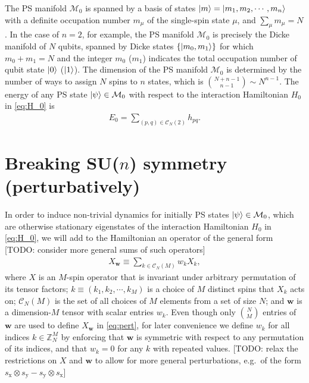 \documentclass[nofootinbib,notitlepage,11pt]{revtex4-2}
\newcommand{\p}[1]{\left(#1\right)} %
\renewcommand{\set}[1]{\left\{#1\right\}} %
\newcommand{\m}{\bm} %
\newcommand{\1}{\mathds{1}}
\newcommand{\x}{\text{x}}
\newcommand{\y}{\text{y}}
\newcommand{\C}{\mathcal{C}}
\newcommand{\M}{\mathcal{M}}
\newcommand{\ZZ}{\mathbb{Z}}
\newcommand{\red}[1]{{\color{red} #1}}
\begin{document}
The PS manifold $\M_0$ is spanned by a basis of states
$\ket{m}=\ket{m_1,m_2,\cdots,m_n}$ with a definite occupation number
$m_\mu$ of the single-spin state $\mu$, and $\sum_\mu m_\mu=N$.  In
the case of $n=2$, for example, the PS manifold $\M_0$ is precisely
the Dicke manifold\cite{dicke1954coherence} of $N$ qubits, spanned by
Dicke states $\set{\ket{m_0,m_1}}$ for which $m_0+m_1=N$ and the
integer $m_0$ ($m_1$) indicates the total occupation number of qubit
state $\ket{0}$ ($\ket{1}$).  The dimension of the PS manifold $\M_0$
is determined by the number of ways to assign $N$ spins to $n$ states,
which is ${N+n-1 \choose n-1}\sim N^{n-1}$.  The energy of any PS
state $\ket\psi\in\M_0$ with respect to the interaction Hamiltonian
$H_0$ in \eqref{eq:H_0} is
\begin{align}
  E_0 = \sum_{\p{p,q}\in\C_N\p{2}} h_{pq}.
\end{align}

\section{Breaking SU($n$) symmetry (perturbatively)}
\label{eq:pert_theory}

In order to induce non-trivial dynamics for initially PS states
$\ket\psi\in\M_0$, which are otherwise stationary eigenstates of the
interaction Hamiltonian $H_0$ in \eqref{eq:H_0}, we will add to the
Hamiltonian an operator of the general form \red{[TODO: consider more
  general sums of such operators]}
\begin{align}
  X_{\m w} \equiv \sum_{k\in\C_N\p{M}} w_k X_k,
  \label{eq:pert}
\end{align}
where $X$ is an $M$-spin operator that is invariant under arbitrary
permutation of its tensor factors; $k\equiv\p{k_1,k_2,\cdots,k_M}$ is
a choice of $M$ distinct spins that $X_k$ acts on; $\C_N\p{M}$ is the
set of all choices of $M$ elements from a set of size $N$; and $\m w$
is a dimension-$M$ tensor with scalar entries $w_k$.  Even though only
${N\choose M}$ entries of $\m w$ are used to define $X_{\m w}$ in
\eqref{eq:pert}, for later convenience we define $w_k$ for all indices
$k\in\ZZ_N^M$ by enforcing that $\m w$ is symmetric with respect to
any permutation of its indices, and that $w_k=0$ for any $k$ with
repeated values. \red{[TODO: relax the restrictions on $X$ and $\m w$
  to allow for more general perturbations, e.g.~of the form
  $s_\x\otimes s_\y-s_\y\otimes s_\x$]}
\end{document}
